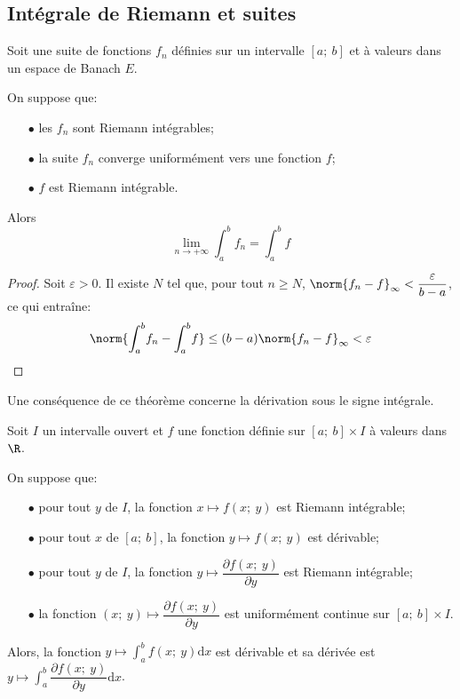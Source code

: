\subsection{Intégrale de Riemann et suites}

\begin{theo}[Convergence]
Soit une suite de fonctions $f_n$ définies sur un intervalle $[a;~b]$ et à valeurs dans un espace de Banach $E$.

On suppose que:
\begin{itemize}
\item[$\bullet$] les $f_n$ sont Riemann intégrables;
\item[$\bullet$] la suite $f_n$ converge uniformément vers une fonction $f$;
\item[$\bullet$] $f$ est Riemann intégrable.
\end{itemize}

Alors
\[
\lim \limits_{n \to +\infty} \displaystyle{\int_a^b} f_n = \displaystyle{\int_a^b} f
\]
\end{theo}


\begin{proof}
Soit $\varepsilon > 0$. Il existe $N$ tel que, pour tout $n \geq N$, $\norm{f_n-f}_{\infty} < \dfrac{\varepsilon}{b-a}$, ce qui entraîne:
\[
\norm{\displaystyle{\int_a^b} f_n-\displaystyle{\int_a^b} f} \leq (b-a) \norm{f_n-f}_{\infty} < \varepsilon
\]
\end{proof}

Une conséquence de ce théorème concerne la dérivation sous le signe intégrale.

\begin{theo}
Soit $I$ un intervalle ouvert et $f$ une fonction définie sur $[a;~b] \times I$ à valeurs dans $\R$.

On suppose que:
\begin{itemize}
\item[$\bullet$] pour tout $y$ de $I$, la fonction $x \mapsto f(x;~y)$ est Riemann intégrable;
\item[$\bullet$] pour tout $x$ de $[a;~b]$, la fonction $y \mapsto f(x;~y)$ est dérivable;
\item[$\bullet$] pour tout $y$ de $I$, la fonction $y \mapsto \dfrac{\partial f(x;~y)}{\partial y}$ est Riemann intégrable;
\item[$\bullet$] la fonction $(x;~y) \mapsto \dfrac{\partial f(x;~y)}{\partial y}$ est uniformément continue sur $[a;~b] \times I$.
\end{itemize}

Alors, la fonction $y \mapsto \displaystyle{\int_a^b} f(x;~y) \mathrm d x$ est dérivable et sa dérivée est $y \mapsto \displaystyle{\int_a^b} \dfrac{\partial f(x;~y)}{\partial y} \mathrm d x$.
\end{theo}

